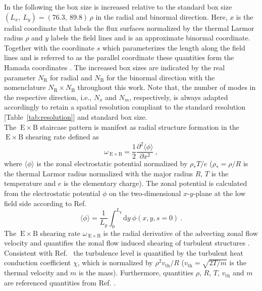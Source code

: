 \documentclass[aip, amsmath, amssymb, reprint, twocolumn, floatfix]{revtex4-1}
\newcommand{\wexb}{\omega_{\mathrm{\:E \times B}}}
\newcommand{\exb}{\mathrm{\:E}\times\mathrm{B}}
\newcommand{\NR}{N_\mathrm{R}}
\newcommand{\NB}{N_\mathrm{B}}
\newcommand{\rhoth}{\rho}
\newcommand{\vth}{v_{\mathrm{th}}}
\newcommand{\xcoord}{x}
\newcommand{\ycoord}{y}
\begin{document}
In the following the box size is increased relative to the standard box size $(L_\xcoord,~L_\ycoord) = (76.3,~89.8)\,\rhoth$ in the radial and binormal direction. Here, $\xcoord$ is the radial coordinate that labels the flux surfaces normalized by the thermal Larmor radius $\rhoth$ and $\ycoord$ labels the field lines and is an approximate binormal coordinate. Together with the coordinate $s$ which parameterizes the length along the field lines and is referred to as the parallel coordinate these quantities form the Hamada coordinates \cite{Hamada1958}.
The increased box sizes are indicated by the real parameter $\NR$ for radial and $\NB$ for the binormal direction with the nomenclature $\NR\times \NB$ throughout this work.
Note that, the number of modes in the respective direction, i.e., $N_x$ and $N_m$, respectively, is always adapted accordingly to retain a spatial resolution compliant to the standard resolution [Table~\ref{tab:resolution}] and standard box size. \\
The $\exb$ staircase pattern is manifest as radial structure formation in the $\exb$ shearing rate defined as\cite{Rath2016, Pueschel2008, Rath2016, Peeters2016}
\begin{equation}
	\wexb = \frac{1}{2} \frac{\partial^2 \langle \phi \rangle}{\partial \xcoord^2}~,
	\label{eq:shearingrate}
\end{equation}
where $\langle \phi \rangle$ is the zonal electrostatic potential normalized by $\rho_\ast T/e$ ($\rho_\ast = \rhoth/R$ is the thermal Larmor radius normalized with the major radius $R$, $T$ is the temperature and $e$ is the elementary charge).
The zonal potential is calculated from the electrostatic potential $\phi$ on the two-dimensional $\xcoord$-$\ycoord$-plane at the low field side according to Ref.~
\begin{equation}
\langle \phi \rangle = \frac{1}{L_\ycoord} \int_0^{L_\ycoord} \mathrm{d}\ycoord ~ \phi(\xcoord,\ycoord,s=0)~.
\end{equation}
The $\exb$ shearing rate $\wexb$ is the radial derivative of the advecting zonal flow velocity \cite{Hahm1995, Waltz1998} and quantifies the zonal flow induced shearing of turbulent structures \cite{Biglari1990, Hahm1995, Burnell1997}. \\
Consistent with Ref.~ the turbulence level is quantified by the turbulent heat conduction coefficient $\chi$, which is normalized by $\rhoth^2 \vth/R$ ($\vth = \sqrt{2 T/m}$ is the thermal velocity and $m$ is the mass). Furthermore, quantities $\rhoth$, $R$, $T$, $\vth$ and $m$ are referenced quantities from Ref. .
\end{document}
